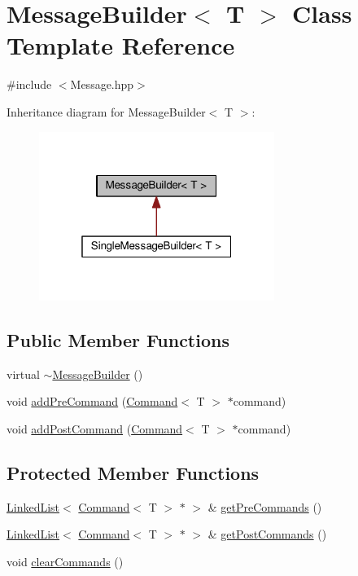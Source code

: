 \hypertarget{classMessageBuilder}{}\section{Message\+Builder$<$ T $>$ Class Template Reference}
\label{classMessageBuilder}


{\ttfamily \#include $<$Message.\+hpp$>$}



Inheritance diagram for Message\+Builder$<$ T $>$\+:\nopagebreak
\begin{figure}[H]
\begin{center}
\leavevmode
\includegraphics[width=217pt]{classMessageBuilder__inherit__graph}
\end{center}
\end{figure}
\subsection*{Public Member Functions}
\begin{DoxyCompactItemize}
\item 
virtual \hyperlink{classMessageBuilder_a1d4818f16ec9c42cd52c99bdf9ffe3ed}{$\sim$\+Message\+Builder} ()
\item 
void \hyperlink{classMessageBuilder_a6a7fe8b106d10fb778b1ed44f3d85a84}{add\+Pre\+Command} (\hyperlink{classCommand}{Command}$<$ T $>$ $\ast$command)
\item 
void \hyperlink{classMessageBuilder_a519dd5cd924bf4bcae771b8de6778944}{add\+Post\+Command} (\hyperlink{classCommand}{Command}$<$ T $>$ $\ast$command)
\end{DoxyCompactItemize}
\subsection*{Protected Member Functions}
\begin{DoxyCompactItemize}
\item 
\hyperlink{classLinkedList}{Linked\+List}$<$ \hyperlink{classCommand}{Command}$<$ T $>$ $\ast$ $>$ \& \hyperlink{classMessageBuilder_a6cc16f4c006c6b8ca8a7f96b55137da0}{get\+Pre\+Commands} ()
\item 
\hyperlink{classLinkedList}{Linked\+List}$<$ \hyperlink{classCommand}{Command}$<$ T $>$ $\ast$ $>$ \& \hyperlink{classMessageBuilder_a934c7fbe2a922db44ef63b0c0bf4e572}{get\+Post\+Commands} ()
\item 
void \hyperlink{classMessageBuilder_a3831f41693da9ee6b74bdfcd4c760f8e}{clear\+Commands} ()
\end{DoxyCompactItemize}


